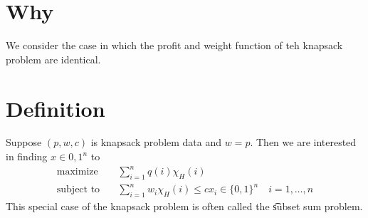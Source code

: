 
\section*{Why}

We consider the case in which the profit and weight function of teh knapsack problem are identical.

\section*{Definition}

Suppose $(p, w, c)$ is knapsack problem data and $w = p$.
Then we are interested in finding $x \in {0,1}^n$ to
\[
\begin{aligned}
\text{maximize} & \quad \textstyle \sum_{i = 1}^{n} q(i) \chi _{H}(i) \\
\text{subject to} & \quad \textstyle \sum_{i = 1}^{n} w_i \chi _{H}(i) \leq c
x_i \in \{0,1\}^n \quad i = 1, \dots , n
\end{aligned}
\]
This special case of the knapsack problem is often called the \t{subset sum problem}.

\blankpage